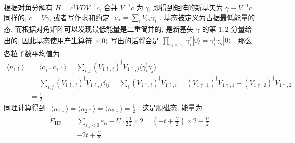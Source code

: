 根据对角分解有 $H = c^{\dagger}VDV^{-1}c$, 合并 $V^{-1}c$ 为 $\gamma$, 即得到矩阵的新基矢为 $\gamma\equiv V^{-1}c$. 同样的, $c = V\gamma$, 或者写作求和约定 $\begin{aligned}
    c_{\alpha} = \sum_{i}V_{\alpha i}\gamma_{i}
  \end{aligned}$. 基态被定义为占据最低能量的态, 而根据对角矩阵可以发现最低能量是二重简并的, 是新基矢 $\gamma$ 的第 $1,2$ 分量给出的, 因此基态使用产生算符 $\times|0\rangle$ 写出的话将会是$\begin{aligned}
    \prod_{\varepsilon_{i}<\varepsilon_{F}}\gamma_{i}^{\dagger}|0\rangle = \gamma_{1}^{\dagger}\gamma_{2}^{\dagger}|0\rangle
  \end{aligned}$. 那么各粒子数平均值为 
  \begin{align*}
    \langle n_{1\uparrow}\rangle 
    &= \langle c_{1\uparrow}^{\dagger}c_{1\uparrow}\rangle
     = \sum_{i,j}(V_{1\uparrow,i})^{\dagger}V_{1\uparrow,j}\langle\gamma_{i}^{\dagger}\gamma_{j}\rangle\\
    &= \sum_{i,j}(V_{1\uparrow, i})^{\dagger}V_{1\uparrow,j}\delta_{ij} 
     = \sum_{i}(V_{1\uparrow, i})^{\dagger}V_{1\uparrow,i} 
     = (V_{1\uparrow,1})^{\dagger}V_{1\uparrow,1} + (V_{1\uparrow,2})^{\dagger}V_{1\uparrow,2} \\
    &= \frac{1}{2}
  \end{align*}
  同理计算得到 $\begin{aligned}
    \langle n_{1\downarrow}\rangle = \langle n_{2\uparrow}\rangle = \langle n_{2\downarrow}\rangle = \frac{1}{2}
  \end{aligned}$. 这是顺磁态, 能量为 
  \begin{align*}
    E_{\text{HF}} &= \sum_{\varepsilon_{\alpha}<0}\varepsilon_{\alpha}
    - U\cdot \frac{1}{2}\frac{1}{2}\times 2 = \left(-t + \frac{U}{2}\right)\times 2 - \frac{U}{2}\\
    &= -2t + \frac{U}{2}
  \end{align*}